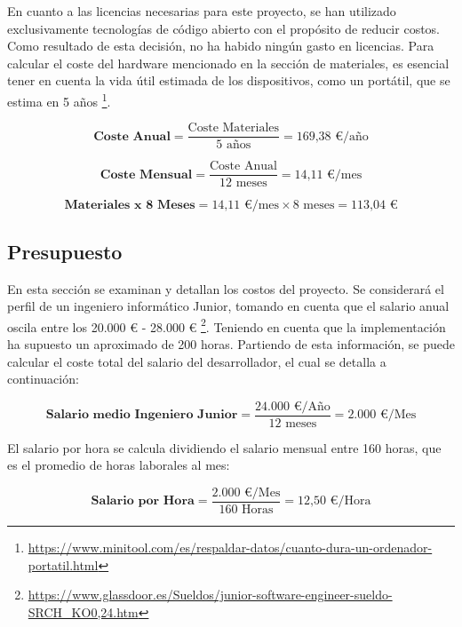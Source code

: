 En cuanto a las licencias necesarias para este proyecto, se han utilizado exclusivamente tecnologías de código abierto con el propósito de reducir costos. Como resultado de esta decisión, no ha habido ningún gasto en licencias. Para calcular el coste del hardware mencionado en la sección de materiales, es esencial tener en cuenta la vida útil estimada de los dispositivos, como un portátil, que se estima en 5 años \footnote{\url{https://www.minitool.com/es/respaldar-datos/cuanto-dura-un-ordenador-portatil.html}}.

\begin{equation}
    \textbf{Coste Anual} = \frac {\text{Coste Materiales}}{\text{5 años}} = \text{169,38 €/año}
\end{equation}

\begin{equation}
    \textbf{Coste Mensual} = \frac {\text{Coste Anual}}{\text{12 meses}} = \text{14,11 €/mes}
\end{equation}

\begin{equation}
    \textbf{Materiales x 8 Meses} = \text{14,11 €/mes} \times \text{8 meses} = \text{113,04 €}
\end{equation}


\subsection{Presupuesto}

En esta sección se examinan y detallan los costos del proyecto. Se considerará el perfil de un ingeniero informático Junior, tomando en cuenta que el salario anual oscila entre los 20.000 € - 28.000 € \footnote{\url{https://www.glassdoor.es/Sueldos/junior-software-engineer-sueldo-SRCH_KO0,24.htm}}. Teniendo en cuenta que la implementación ha supuesto un aproximado de 200 horas. Partiendo de esta información, se puede calcular el coste total del salario del desarrollador, el cual se detalla a continuación:

\begin{equation}
    \textbf{Salario medio Ingeniero Junior} =  \frac {\text{24.000 €/Año} }{ \text{12 meses}} = \text{2.000 €/Mes}
\end{equation}

El salario por hora se calcula dividiendo el salario mensual entre 160 horas, que es el promedio de horas laborales al mes:

\begin{equation}
    \textbf{Salario por Hora} = \frac {\text{2.000 €/Mes}}{160 \text{ Horas}} = \text{12,50 €/Hora}
\end{equation}

